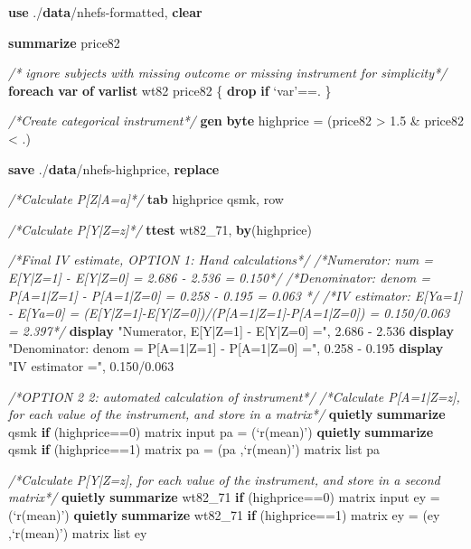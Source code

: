 \documentclass[
  10pt,
]{book}
\newenvironment{Shaded}{\begin{snugshade}}{\end{snugshade}}
\newcommand{\CommentTok}[1]{\textcolor[rgb]{0.56,0.35,0.01}{\textit{#1}}}
\newcommand{\FunctionTok}[1]{\textcolor[rgb]{0.00,0.00,0.00}{#1}}
\newcommand{\KeywordTok}[1]{\textcolor[rgb]{0.13,0.29,0.53}{\textbf{#1}}}
\newcommand{\NormalTok}[1]{#1}
\newcommand{\OtherTok}[1]{\textcolor[rgb]{0.56,0.35,0.01}{#1}}
\newcommand{\StringTok}[1]{\textcolor[rgb]{0.31,0.60,0.02}{#1}}
\begin{document}
\begin{Shaded}
\begin{Highlighting}[]
\KeywordTok{use}\NormalTok{ ./}\KeywordTok{data}\NormalTok{/nhefs-formatted, }\KeywordTok{clear}

\KeywordTok{summarize}\NormalTok{ price82}

\CommentTok{/* ignore subjects with missing outcome or missing instrument for simplicity*/}
\KeywordTok{foreach} \KeywordTok{var} \KeywordTok{of} \KeywordTok{varlist}\NormalTok{ wt82 price82 \{}
  \KeywordTok{drop} \KeywordTok{if} \OtherTok{`var'}\NormalTok{==.}
\NormalTok{\}}

\CommentTok{/*Create categorical instrument*/}
\KeywordTok{gen} \KeywordTok{byte}\NormalTok{ highprice = (price82 > 1.5 & price82 < .)}

\KeywordTok{save}\NormalTok{ ./}\KeywordTok{data}\NormalTok{/nhefs-highprice, }\KeywordTok{replace}

\CommentTok{/*Calculate P[Z|A=a]*/}
\KeywordTok{tab}\NormalTok{ highprice qsmk, }\OtherTok{row}

\CommentTok{/*Calculate P[Y|Z=z]*/}
\KeywordTok{ttest}\NormalTok{ wt82_71, }\KeywordTok{by}\NormalTok{(highprice)}

\CommentTok{/*Final IV estimate, OPTION 1: Hand calculations*/}
\CommentTok{/*Numerator: num = E[Y|Z=1] - E[Y|Z=0] = 2.686 - 2.536 = 0.150*/}
\CommentTok{/*Denominator: denom = P[A=1|Z=1] - P[A=1|Z=0] = 0.258 - 0.195 = 0.063 */} 
\CommentTok{/*IV estimator: E[Ya=1] - E[Ya=0] = (E[Y|Z=1]-E[Y|Z=0])/(P[A=1|Z=1]-P[A=1|Z=0]) = 0.150/0.063 = 2.397*/}
\KeywordTok{display} \StringTok{"Numerator, E[Y|Z=1] - E[Y|Z=0] ="}\NormalTok{, 2.686 - 2.536}
\KeywordTok{display} \StringTok{"Denominator: denom = P[A=1|Z=1] - P[A=1|Z=0] ="}\NormalTok{, 0.258 - 0.195}
\KeywordTok{display} \StringTok{"IV estimator ="}\NormalTok{, 0.150/0.063}

\CommentTok{/*OPTION 2 2: automated calculation of instrument*/}
\CommentTok{/*Calculate P[A=1|Z=z], for each value of the instrument, }
\CommentTok{and store in a matrix*/}
\KeywordTok{quietly} \KeywordTok{summarize}\NormalTok{ qsmk }\KeywordTok{if}\NormalTok{ (highprice==0)}
\FunctionTok{matrix}\NormalTok{ input pa = (}\OtherTok{`r(mean)'}\NormalTok{)}
\KeywordTok{quietly} \KeywordTok{summarize}\NormalTok{ qsmk }\KeywordTok{if}\NormalTok{ (highprice==1)}
\FunctionTok{matrix}\NormalTok{ pa = (pa ,}\OtherTok{`r(mean)'}\NormalTok{)}
\FunctionTok{matrix} \OtherTok{list}\NormalTok{ pa}

\CommentTok{/*Calculate P[Y|Z=z], for each value of the instrument, }
\CommentTok{and store in a second matrix*/}
\KeywordTok{quietly} \KeywordTok{summarize}\NormalTok{ wt82_71 }\KeywordTok{if}\NormalTok{ (highprice==0)}
\FunctionTok{matrix}\NormalTok{ input ey = (}\OtherTok{`r(mean)'}\NormalTok{)}
\KeywordTok{quietly} \KeywordTok{summarize}\NormalTok{ wt82_71 }\KeywordTok{if}\NormalTok{ (highprice==1)}
\FunctionTok{matrix}\NormalTok{ ey = (ey ,}\OtherTok{`r(mean)'}\NormalTok{)}
\FunctionTok{matrix} \OtherTok{list}\NormalTok{ ey}


\end{Highlighting}
\end{Shaded}
\end{document}
